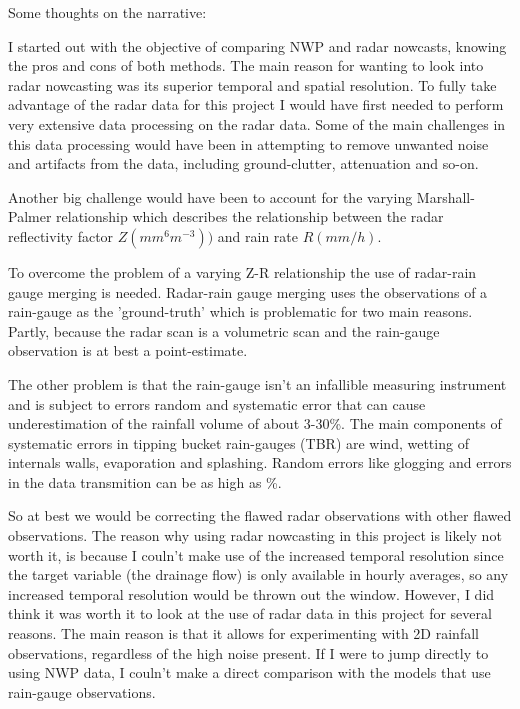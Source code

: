 Some thoughts on the narrative:

I started out with the objective of comparing NWP and radar nowcasts, knowing the pros and cons of both methods. The main reason for wanting to look into radar nowcasting was its superior temporal and spatial resolution. To fully take advantage of the radar data for this project I would have first needed to perform very extensive data processing on the radar data. Some of the main challenges in this data processing would have been in attempting to remove unwanted noise and artifacts from the data, including ground-clutter, attenuation and so-on. 

Another big challenge would have been to account for the varying Marshall-Palmer relationship which describes the relationship between the radar reflectivity factor $Z (mm^6 m^{-3}))$ and rain rate $R(mm/h)$. 

To overcome the problem of a varying Z-R relationship the use of radar-rain gauge merging is needed. Radar-rain gauge merging uses the observations of a rain-gauge as the 'ground-truth' which is problematic for two main reasons. Partly, because the radar scan is a volumetric scan and the rain-gauge observation is at best a point-estimate. 

The other problem is that the rain-gauge isn't an infallible measuring instrument and is subject to errors random and systematic error that can cause underestimation of the rainfall volume of about 3-30\%. The main components of systematic errors in tipping bucket rain-gauges (TBR) are wind, wetting of internals walls, evaporation and splashing. Random errors like glogging and errors in the data transmition can be as high as \%. 

So at best we would be correcting the flawed radar observations with other flawed observations. The reason why using radar nowcasting in this project is likely not worth it, is because I couln't make use of the increased temporal resolution since the target variable (the drainage flow) is only available in hourly averages, so any increased temporal resolution would be thrown out the window. However, I did think it was worth it to look at the use of radar data in this project for several reasons. The main reason is that it allows for experimenting with 2D rainfall observations, regardless of the high noise present. If I were to jump directly to using NWP data, I couln't make a direct comparison with the models that use rain-gauge observations. 


